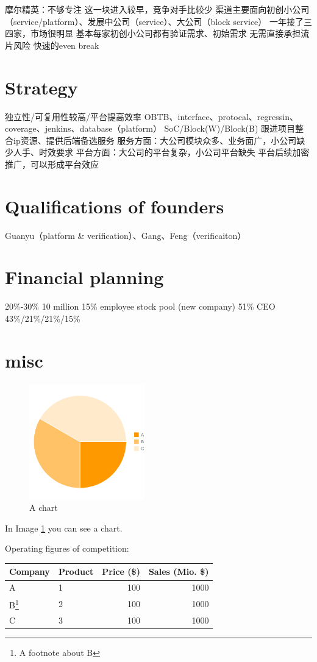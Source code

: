 \documentclass[a4paper,11pt]{article}
\begin{document}
摩尔精英：不够专注
这一块进入较早，竞争对手比较少
渠道主要面向初创小公司（service/platform）、发展中公司（service）、大公司（block service）
一年接了三四家，市场很明显
基本每家初创小公司都有验证需求、初始需求
无需直接承担流片风险
快速的even break

\section{Strategy}
独立性/可复用性较高/平台提高效率
OBTB、interface、protocal、regressin、coverage、jenkins、database（platform）
SoC/Block(W)/Block(B)
跟进项目整合ip资源、提供后端备选服务
服务方面：大公司模块众多、业务面广，小公司缺少人手、时效要求
平台方面：大公司的平台复杂，小公司平台缺失
平台后续加密推广，可以形成平台效应

\section{Qualifications of founders}
Guanyu（platform \& verification）、Gang、Feng（verificaiton）

\section{Financial planning}
20\%-30\% 10 million
15\% employee stock pool (new company)
51\% CEO
43\%/21\%/21\%/15\%

\section{misc}
\begin{figure}[ht]
  \centering
  \includegraphics[width=5cm]{images/chart.png}
  \caption{A chart}
  \label{fig:chart}
\end{figure}
In Image \ref{fig:chart} you can see a chart.

Operating figures of competition:
\begin{center}
  \begin{tabular}{l|l|r|r}
    Company & Product & Price (\$) & \pbox{20cm}{Sales\\(Mio. \$)}\\
    \hline
    A & 1 & 100 & 1000\\
    B\footnote{A footnote about B} & 2 & 100 & 1000\\
    C & 3 & 100 & 1000\\
  \end{tabular}
\end{center}
\end{document}
